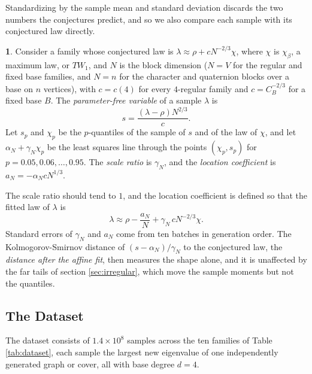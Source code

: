 \documentclass[12pt,oneside,english]{amsart}
\numberwithin{equation}{section}
\numberwithin{figure}{section}
\numberwithin{table}{section}
\theoremstyle{plain}
\numberwithin{thm}{section}
\theoremstyle{plain}
\theoremstyle{plain}
\theoremstyle{plain}
\theoremstyle{definition}
\newtheorem{defn}[thm]{\protect\definitionname}
\theoremstyle{definition}
\theoremstyle{definition}
\theoremstyle{remark}
\providecommand{\definitionname}{Definition}
\begin{document}
Standardizing by the sample mean and standard deviation discards the
two numbers the conjectures predict, and so we also compare each sample
with its conjectured law directly.
\begin{defn}
\label{def:finite_size_parameters}Consider a family whose conjectured
law is $\lambda\approx\rho+cN^{-2/3}\chi$, where $\chi$ is $\chi_{\beta}$,
a maximum law, or $TW_{1}$, and $N$ is the block dimension ($N=V$
for the regular and fixed base families, and $N=n$ for the character
and quaternion blocks over a base on $n$ vertices), with $c=c(4)$
for every $4$-regular family and $c=C_{B}^{-2/3}$ for a fixed base
$B$. The \emph{parameter-free variable} of a sample $\lambda$ is
\[
s=\frac{(\lambda-\rho)N^{2/3}}{c}.
\]
Let $s_{p}$ and $\chi_{p}$ be the $p$-quantiles of the sample of
$s$ and of the law of $\chi$, and let $\alpha_{N}+\gamma_{N}\chi_{p}$
be the least squares line through the points $(\chi_{p},s_{p})$ for
$p=0.05,0.06,\dots,0.95$. The \emph{scale ratio} is $\gamma_{N}$,
and the \emph{location coefficient} is $a_{N}=-\alpha_{N}cN^{1/3}$.
\end{defn}
The scale ratio should tend to $1$, and the location coefficient is
defined so that the fitted law of $\lambda$ is
\begin{equation}
\lambda\approx\rho-\frac{a_{N}}{N}+\gamma_{N}\,cN^{-2/3}\chi.\label{eq:finite_size_law}
\end{equation}
Standard errors of $\gamma_{N}$ and $a_{N}$ come from ten batches
in generation order. The Kolmogorov-Smirnov distance of $(s-\alpha_{N})/\gamma_{N}$
to the conjectured law, the \emph{distance after the affine fit},
then measures the shape alone, and it is unaffected by the far tails
of section \ref{sec:irregular}, which move the sample moments but
not the quantiles.

\subsection{\label{subsec:dataset}The Dataset}

The dataset consists of $1.4\times10^{8}$ samples across the ten
families of Table \ref{tab:dataset}, each sample the largest new eigenvalue
of one independently generated graph or cover, all with base degree
$d=4$.
\end{document}
